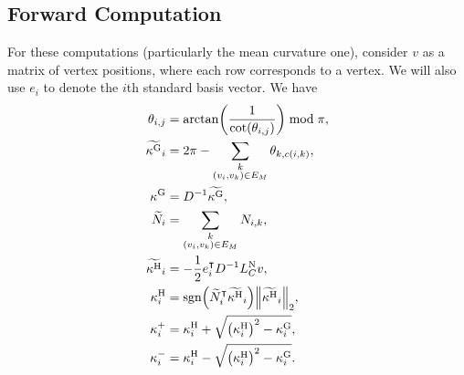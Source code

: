 \subsection{Forward Computation}
For these computations (particularly the mean curvature one), consider \(v\) as a matrix of vertex positions, where each row corresponds to a vertex. We will also use \(e_i\) to denote the \(i\)th standard basis vector. We have \begin{align*}
	\theta_{i, j} &= \arctan\pof{\frac{1}{\cot\pof{\theta_{i, j}}}} \bmod \pi, \\
	\widetilde{\kappa^\text{G}}_i &= 2\pi - \sum_{\substack{k \\ \pof{v_i, v_k} \in E_M}} \theta_{k, c\pof{i, k}}, \\
	\kappa^\text{G} &= D^{-1}\widetilde{\kappa^\text{G}}, \\
	\widetilde{N}_i &= \sum_{\substack{k \\ \pof{v_i, v_k} \in E_M}} N_{i, k}, \\
	\widetilde{\kappa^\text{H}}_i &= -\frac{1}{2}e_i^\intercal D^{-1}L_C^{\text{N}}v, \\
	\kappa^\text{H}_i &= \sgn\pof{\widetilde{N}_i^\intercal\widetilde{\kappa^\text{H}}_i}\norm{\widetilde{\kappa^\text{H}}_i}_2, \\
	\kappa^+_i &= \kappa^{\text{H}}_i + \sqrt{\pof{\kappa^{\text{H}}_i}^2 - \kappa^{\text{G}}_i}, \\
	\kappa^-_i &= \kappa^{\text{H}}_i - \sqrt{\pof{\kappa^{\text{H}}_i}^2 - \kappa^{\text{G}}_i}.
\end{align*}

